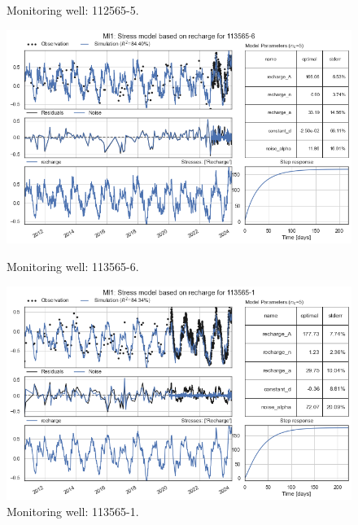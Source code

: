 \begin{figure}[htbp]
\begin{minipage}{0.32\textwidth}
        \caption{Monitoring well: 112565-5.}
        \label{fig:112565-3}
    \end{minipage}
\end{figure}

\begin{figure}[htbp]
    \centering
    \begin{minipage}{0.32\textwidth}
        \centering
        \includegraphics[width=\linewidth]{frontmatter/Rozenburg-fig/7.png}
        \caption{Monitoring well: 113565-6.}
        \label{fig:112565-3}
    \end{minipage}
    \hfill
    \begin{minipage}{0.32\textwidth}
        \centering
        \includegraphics[width=\linewidth]{frontmatter/Rozenburg-fig/8.png}
        \caption{Monitoring well: 113565-1.}
        \label{fig:112565-3}
    \end{minipage}
    \hfill
    \begin{minipage}{0.32\textwidth}

\end{minipage}
\end{figure}
